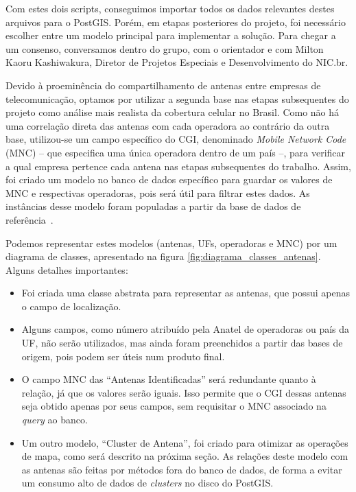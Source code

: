 \documentclass[]{politex}
\begin{document}
Com estes dois scripts, conseguimos importar todos os dados relevantes destes
arquivos para o PostGIS. Porém, em etapas posteriores do projeto, foi necessário
escolher entre um modelo principal para implementar a solução. Para chegar a um
consenso, conversamos dentro do grupo, com o orientador e com Milton Kaoru
Kashiwakura, Diretor de Projetos Especiais e Desenvolvimento do NIC.br.

Devido à proeminência do compartilhamento de antenas entre empresas de
telecomunicação, optamos por utilizar a segunda base nas etapas subsequentes do
projeto como análise mais realista da cobertura celular no Brasil. Como não há
uma correlação direta das antenas com cada operadora ao contrário da outra
base, utilizou-se um campo específico do CGI, denominado \textit{Mobile Network
Code} (MNC) -- que especifica uma única operadora dentro de um país --,
para verificar a qual empresa pertence cada antena nas etapas subsequentes
do trabalho. Assim, foi criado um modelo no banco de dados específico para
guardar os valores de MNC e respectivas operadoras, pois será útil para filtrar
estes dados. As instâncias desse modelo foram populadas a partir da base de
dados de referência~\cite{mcc-mnc}.

Podemos representar estes modelos (antenas, UFs, operadoras e MNC) por um
diagrama de classes, apresentado na figura \ref{fig:diagrama_classes_antenas}.
Alguns detalhes importantes:

\begin{itemize}
\item Foi criada uma classe abstrata para representar as antenas, que possui
apenas o campo de localização.
\item Alguns campos, como número atribuído pela Anatel de operadoras ou país da
UF, não serão utilizados, mas ainda foram preenchidos a partir das bases de
origem, pois podem ser úteis num produto final.
\item O campo MNC das ``Antenas Identificadas'' será redundante quanto à
relação, já que os valores serão iguais. Isso permite que o CGI dessas antenas
seja obtido apenas por seus campos, sem requisitar o MNC associado na
\textit{query} ao banco.
\item Um outro modelo, ``Cluster de Antena'', foi criado para otimizar as
operações de mapa, como será descrito na próxima seção. As relações deste
modelo com as antenas são feitas por métodos fora do banco de dados, de forma a
evitar um consumo alto de dados de \textit{clusters} no disco do PostGIS.
\end{itemize}
\end{document}
